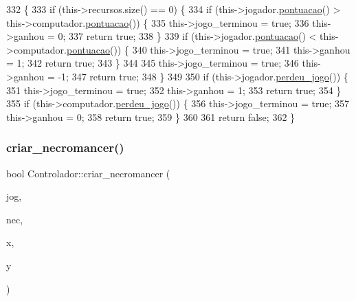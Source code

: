 \begin{DoxyCode}
332                                 \{
333     \textcolor{keywordflow}{if} (this->recursos.size() == 0) \{
334         \textcolor{keywordflow}{if} (this->jogador.\mbox{\hyperlink{class_player_a945277689283bc50bd3afef306bf9740}{pontuacao}}() > this->computador.\mbox{\hyperlink{class_player_a945277689283bc50bd3afef306bf9740}{pontuacao}}()) \{
335             this->jogo\_terminou = \textcolor{keyword}{true};
336             this->ganhou = 0;
337             \textcolor{keywordflow}{return} \textcolor{keyword}{true};
338         \}
339         \textcolor{keywordflow}{if} (this->jogador.\mbox{\hyperlink{class_player_a945277689283bc50bd3afef306bf9740}{pontuacao}}() < this->computador.\mbox{\hyperlink{class_player_a945277689283bc50bd3afef306bf9740}{pontuacao}}()) \{
340             this->jogo\_terminou = \textcolor{keyword}{true};
341             this->ganhou = 1;
342             \textcolor{keywordflow}{return} \textcolor{keyword}{true};
343         \}
344 
345         this->jogo\_terminou = \textcolor{keyword}{true};
346         this->ganhou = -1;
347         \textcolor{keywordflow}{return} \textcolor{keyword}{true};
348     \}
349 
350     \textcolor{keywordflow}{if} (this->jogador.\mbox{\hyperlink{class_player_aad208bab9f9f88af5ac34ebe7c31dc61}{perdeu\_jogo}}()) \{
351         this->jogo\_terminou = \textcolor{keyword}{true};
352         this->ganhou = 1;
353         \textcolor{keywordflow}{return} \textcolor{keyword}{true};
354     \}
355     \textcolor{keywordflow}{if} (this->computador.\mbox{\hyperlink{class_player_aad208bab9f9f88af5ac34ebe7c31dc61}{perdeu\_jogo}}()) \{
356         this->jogo\_terminou = \textcolor{keyword}{true};
357         this->ganhou = 0;
358         \textcolor{keywordflow}{return} \textcolor{keyword}{true};
359     \}
360 
361     \textcolor{keywordflow}{return} \textcolor{keyword}{false};
362 \}
\end{DoxyCode}
\mbox{\label{class_controlador_aa444d0b080f4d4ecc397819d97098a3a}} 
\subsubsection{\texorpdfstring{criar\+\_\+necromancer()}{criar\_necromancer()}}
{\footnotesize\ttfamily bool Controlador\+::criar\+\_\+necromancer (\begin{DoxyParamCaption}\item[{\mbox{\hyperlink{class_player}{Player}} $\ast$}]{jog,  }\item[{Tipo\+Necromancer}]{nec,  }\item[{unsigned short}]{x,  }\item[{unsigned short}]{y }\end{DoxyParamCaption})}


